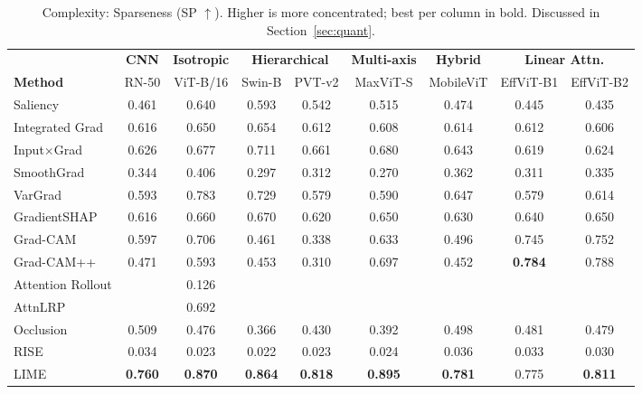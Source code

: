 \documentclass[final,5p,times,twocolumn]{elsarticle}
\newcommand{\best}[1]{\textbf{#1}}
\newcommand{\nd}{\textemdash}
\begin{document}
\begin{table}[t]
  \centering
  \caption{Complexity: Sparseness (SP $\uparrow$). Higher is more concentrated; best per column in bold. Discussed in Section~\ref{sec:quant}.}
  \label{tab:sp}
  \setlength{\tabcolsep}{4pt}
  \begin{tabular}{l cc cc cc cc}
    \toprule
     & \multicolumn{1}{c}{\textbf{CNN}} & \multicolumn{1}{c}{\textbf{Isotropic}} & \multicolumn{2}{c}{\textbf{Hierarchical}} & \multicolumn{1}{c}{\textbf{Multi-axis}} & \multicolumn{1}{c}{\textbf{Hybrid}} & \multicolumn{2}{c}{\textbf{Linear Attn.}} \\
    \cmidrule(lr){2-2} \cmidrule(lr){3-3} \cmidrule(lr){4-5} \cmidrule(lr){6-6} \cmidrule(lr){7-7} \cmidrule(lr){8-9}
    \textbf{Method} & RN-50 & ViT-B/16 & Swin-B & PVT-v2 & MaxViT-S & MobileViT & EffViT-B1 & EffViT-B2 \\
    \midrule
    Saliency & 0.461 & 0.640 & 0.593 & 0.542 & 0.515 & 0.474 & 0.445 & 0.435 \\
    Integrated Grad & 0.616 & 0.650 & 0.654 & 0.612 & 0.608 & 0.614 & 0.612 & 0.606 \\
    Input$\times$Grad & 0.626 & 0.677 & 0.711 & 0.661 & 0.680 & 0.643 & 0.619 & 0.624 \\
    SmoothGrad & 0.344 & 0.406 & 0.297 & 0.312 & 0.270 & 0.362 & 0.311 & 0.335 \\
    VarGrad & 0.593 & 0.783 & 0.729 & 0.579 & 0.590 & 0.647 & 0.579 & 0.614 \\
    GradientSHAP & 0.616 & 0.660 & 0.670 & 0.620 & 0.650 & 0.630 & 0.640 & 0.650 \\
    \midrule
    Grad-CAM & 0.597 & 0.706 & 0.461 & 0.338 & 0.633 & 0.496 & 0.745 & 0.752 \\
    Grad-CAM++ & 0.471 & 0.593 & 0.453 & 0.310 & 0.697 & 0.452 & \best{0.784} & 0.788 \\
    \midrule
    Attention Rollout & \nd & 0.126 & \nd & \nd & \nd & \nd & \nd & \nd \\
    AttnLRP &\nd & 0.692 & \nd & \nd & \nd & \nd & \nd & \nd \\
    \midrule
    Occlusion & 0.509 & 0.476 & 0.366 & 0.430 & 0.392 & 0.498 & 0.481 & 0.479 \\
    RISE & 0.034 & 0.023 & 0.022 & 0.023 & 0.024 & 0.036 & 0.033 & 0.030 \\
    LIME & \best{0.760} & \best{0.870} & \best{0.864} & \best{0.818} & \best{0.895} & \best{0.781} & 0.775 & \best{0.811} \\
    \bottomrule
  \end{tabular}
\end{table}
\end{document}
